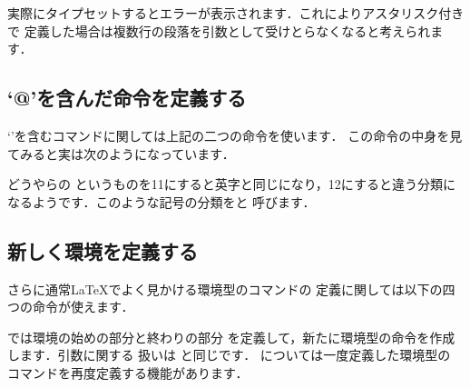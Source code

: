 実際にタイプセットするとエラーが表示されます．これによりアスタリスク付きで
定義した場合は複数行の段落を引数として受けとらなくなると考えられます．

\subsection{`@'を含んだ命令を定義する}
\begin{usage}
\makeatletter %
\makeatother  %
\end{usage}

`'を含むコマンドに関しては上記の二つの命令を使います．
この命令の中身を見てみると実は次のようになっています．

\begin{intext}
\makeatletter
\renewcommand{\section}{%
    \@startsection{section}{1}{\z@}%
    {\Cvs \@plus.5\Cdp \@minus.2\Cdp}%
    {.5\Cvs \@plus.3\Cdp}%
    {\normalfont\Large\headfont\raggedright}}
} 
\makeatother
\end{intext}

どうやらの{}
というものを11にすると英字と同じになり，12にすると違う分類に
なるようです．このような記号の分類を{}と
呼びます．




\subsection{新しく環境を定義する}

さらに通常{\LaTeX}でよく見かける環境型のコマンドの
定義に関しては以下の四つの命令が使えます．
\begin{usage}
\newenvironment{$\<環境名>$}[$\<引数の個数>$][$\<標準値>$]{$\<始め>$}{$\<終わり>$}
\renewenvironment{$\<環境名>$}[$\<引数の個数>$][$\<標準値>$]{$\<始め>$}{$\<終わり>$}
\end{usage}
では環境の始めの部分と終わりの部分
を定義して，新たに環境型の命令を作成します．引数に関する
扱いは と同じです．
については一度定義した環境型の
コマンドを再度定義する機能があります．

